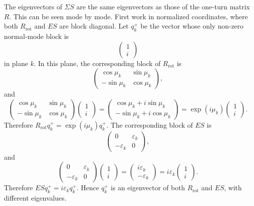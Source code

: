 The eigenvectors of $\Sigma S$ are the same eigenvectors as those of the
one-turn matrix $R$. This can be seen mode by mode. First work in normalized
coordinates, where both $R_{\mathrm{rot}}$ and $ES$ are block diagonal. Let
$q_k^+$ be the vector whose only non-zero normal-mode block is
\begin{equation}
\left(\begin{array}{c}
1\\
i
\end{array}\right)
\end{equation}
in plane $k$. In this plane, the corresponding block of $R_{\mathrm{rot}}$ is
\begin{equation}
\left(\begin{array}{cc}
\cos \mu_k & \sin \mu_k\\
-\sin \mu_k & \cos \mu_k
\end{array}\right),
\end{equation}
and
\begin{equation}
\left(\begin{array}{cc}
\cos \mu_k & \sin \mu_k\\
-\sin \mu_k & \cos \mu_k
\end{array}\right)
\left(\begin{array}{c}
1\\
i
\end{array}\right)
=
\left(\begin{array}{c}
\cos \mu_k+i\sin \mu_k\\
-\sin \mu_k+i\cos \mu_k
\end{array}\right)
=
\exp(i\mu_k)
\left(\begin{array}{c}
1\\
i
\end{array}\right).
\end{equation}
Therefore $R_{\mathrm{rot}} q_k^+ = \exp(i\mu_k)q_k^+$. The corresponding block of $ES$ is
\begin{equation}
\left(\begin{array}{cc}
0 & \varepsilon_k\\
-\varepsilon_k & 0
\end{array}\right),
\end{equation}
and
\begin{equation}
\left(\begin{array}{cc}
0 & \varepsilon_k\\
-\varepsilon_k & 0
\end{array}\right)
\left(\begin{array}{c}
1\\
i
\end{array}\right)
=
\left(\begin{array}{c}
i\varepsilon_k\\
-\varepsilon_k
\end{array}\right)
=
i\varepsilon_k
\left(\begin{array}{c}
1\\
i
\end{array}\right).
\end{equation}
Therefore $ESq_k^+ = i\varepsilon_k q_k^+$. Hence $q_k^+$ is an eigenvector of
both $R_{\mathrm{rot}}$ and $ES$, with different eigenvalues.

